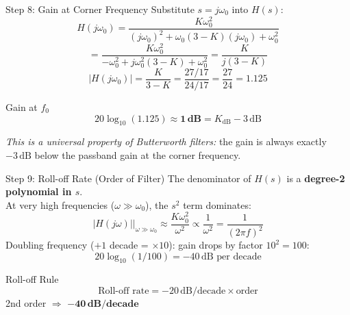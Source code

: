 \documentclass{beamer}
\begin{document}
\begin{frame}{Step 8: Gain at Corner Frequency}
  Substitute $s = j\omega_0$ into $H(s)$:
  \[
    H(j\omega_0) = \frac{K\omega_0^2}{(j\omega_0)^2 + \omega_0(3-K)(j\omega_0) + \omega_0^2}
  \]
  \[
    = \frac{K\omega_0^2}{-\omega_0^2 + j\omega_0^2(3-K) + \omega_0^2}
    = \frac{K}{j(3-K)}
  \]
  \[
    |H(j\omega_0)| = \frac{K}{3-K} = \frac{27/17}{24/17} = \frac{27}{24} = 1.125
  \]
  \begin{block}{Gain at $f_0$}
    \[
      20\log_{10}(1.125) \approx \mathbf{1\,\text{dB}} = K_{\text{dB}} - 3\,\text{dB}
    \]
  \end{block}
  \vspace{0.3em}
  \textit{This is a universal property of Butterworth filters:} the gain is
  always exactly $-3\,\text{dB}$ below the passband gain at the corner frequency.
\end{frame}

\begin{frame}{Step 9: Roll-off Rate (Order of Filter)}
  The denominator of $H(s)$ is a \textbf{degree-2 polynomial in $s$}.\\[0.5em]
  At very high frequencies ($\omega \gg \omega_0$), the $s^2$ term dominates:
  \[
    |H(j\omega)|\Big|_{\omega\gg\omega_0} \approx \frac{K\omega_0^2}{\omega^2}
    \propto \frac{1}{\omega^2} = \frac{1}{(2\pi f)^2}
  \]
  Doubling frequency ($+1$ decade = $\times 10$): gain drops by factor $10^2 = 100$:
  \[
    20\log_{10}(1/100) = -40\,\text{dB per decade}
  \]
  \begin{block}{Roll-off Rule}
    \[
      \text{Roll-off rate} = -20\,\text{dB/decade} \times \text{order}
    \]
    2nd order $\Rightarrow$ $\mathbf{-40\,\text{dB/decade}}$
  \end{block}
\end{frame}
\end{document}
